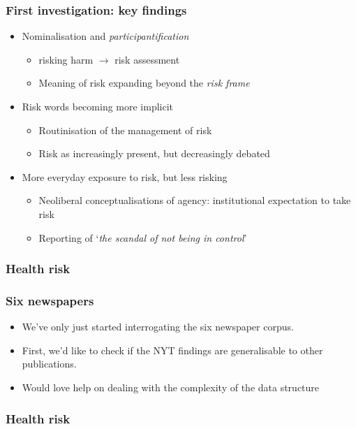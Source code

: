 \documentclass{beamer}       %
\begin{document}
\begin{frame}
    \frametitle{First investigation: key findings}
    
    \begin{itemize}
    \item Nominalisation and \emph{participantification}
    \begin{itemize}
        \item risking harm $\rightarrow$ risk assessment
        \item Meaning of risk expanding beyond the \emph{risk frame}
    \end{itemize}
    \item Risk words becoming more implicit
    \begin{itemize}
        \item Routinisation of the management of risk
        \item Risk as increasingly present, but decreasingly debated
    \end{itemize}
    \item More everyday exposure to risk, but less risking
    \begin{itemize}
        \item Neoliberal conceptualisations of agency: institutional expectation to take risk
        \item Reporting of `\emph{the scandal of not being in control}' \cite{beck_risk_1992}
    \end{itemize}
    \end{itemize}
\end{frame}

\begin{frame}\frametitle{Health risk}

\end{frame}

\begin{frame}\frametitle{Six newspapers}
\begin{itemize}
\item We've only just started interrogating the six newspaper corpus.
\item First, we'd like to check if the NYT findings are generalisable to other publications.
\item Would love help on dealing with the complexity of the data structure
\end{itemize}
\end{frame}

\begin{frame}\frametitle{Health risk}

\end{frame}
\end{document}
